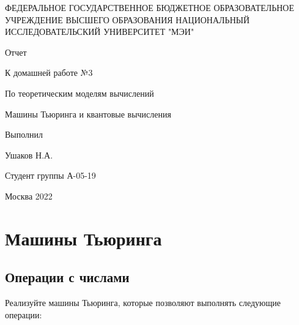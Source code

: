 \documentclass[a4paper, 12pt] {article} %
\begin{document}
\thispagestyle{empty}

\begin{center}
	ФЕДЕРАЛЬНОЕ ГОСУДАРСТВЕННОЕ БЮДЖЕТНОЕ ОБРАЗОВАТЕЛЬНОЕ УЧРЕЖДЕНИЕ ВЫСШЕГО ОБРАЗОВАНИЯ НАЦИОНАЛЬНЫЙ ИССЛЕДОВАТЕЛЬСКИЙ УНИВЕРСИТЕТ "МЭИ"
\end{center}

\vspace{7cm}

\begin{center}
    \Huge Отчет

	\Large К домашней работе №3
	
	\Large По теоретическим моделям вычислений

	\Large Машины Тьюринга и квантовые вычисления
\end{center}

\vspace{3cm}

\begin{flushright}
	Выполнил
	
	Ушаков Н.А. 
	
	Студент группы А-05-19
\end{flushright}

\vfill
\begin{center}
	Москва 2022
\end{center}

\newpage
\section{Машины Тьюринга}

\subsection{Операции с числами}
Реализуйте машины Тьюринга, которые позволяют выполнять следующие операции:
\end{document}
